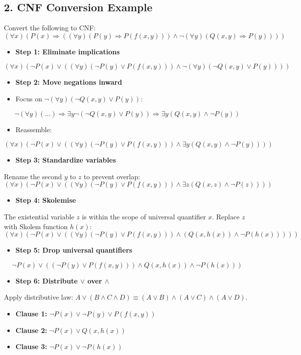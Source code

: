 \subsection{2. CNF Conversion Example}
Convert the following to CNF:
\[ (\forall x)(P(x) \Rightarrow ((\forall y)(P(y) \Rightarrow P(f(x, y))) \land \neg (\forall y)(Q(x, y) \Rightarrow P(y)))) \]

\begin{itemize}
  \item   \textbf{Step 1: Eliminate implications}
\end{itemize}
    \[ (\forall x)(\neg P(x) \lor ((\forall y)(\neg P(y) \lor P(f(x, y))) \land \neg (\forall y)(\neg Q(x, y) \lor P(y)))) \]
\begin{itemize}
  \item   \textbf{Step 2: Move negations inward}
  \item   Focus on $\neg (\forall y)(\neg Q(x, y) \lor P(y))$:
\end{itemize}
        \[ \neg (\forall y)(\dots) \Longrightarrow \exists y \neg(\neg Q(x, y) \lor P(y)) \Longrightarrow \exists y (Q(x, y) \land \neg P(y)) \]
\begin{itemize}
  \item   Reassemble:
\end{itemize}
        \[ (\forall x)(\neg P(x) \lor ((\forall y)(\neg P(y) \lor P(f(x, y))) \land \exists y (Q(x, y) \land \neg P(y)))) \]
\begin{itemize}
  \item   \textbf{Step 3: Standardize variables}
\end{itemize}
    Rename the second $y$ to $z$ to prevent overlap:
    \[ (\forall x)(\neg P(x) \lor ((\forall y)(\neg P(y) \lor P(f(x, y))) \land \exists z (Q(x, z) \land \neg P(z)))) \]
\begin{itemize}
  \item   \textbf{Step 4: Skolemise}
\end{itemize}
    The existential variable $z$ is within the scope of universal quantifier $x$. Replace $z$ with Skolem function $h(x)$:
    \[ (\forall x)(\neg P(x) \lor ((\forall y)(\neg P(y) \lor P(f(x, y))) \land (Q(x, h(x)) \land \neg P(h(x))))) \]
\begin{itemize}
  \item   \textbf{Step 5: Drop universal quantifiers}
\end{itemize}
    \[ \neg P(x) \lor ((\neg P(y) \lor P(f(x, y))) \land Q(x, h(x)) \land \neg P(h(x))) \]
\begin{itemize}
  \item   \textbf{Step 6: Distribute $\lor$ over $\land$}
\end{itemize}
    Apply distributive law: $A \lor (B \land C \land D) \equiv (A \lor B) \land (A \lor C) \land (A \lor D)$.
\begin{itemize}
  \item   \textbf{Clause 1:} $\neg P(x) \lor \neg P(y) \lor P(f(x, y))$
  \item   \textbf{Clause 2:} $\neg P(x) \lor Q(x, h(x))$
  \item   \textbf{Clause 3:} $\neg P(x) \lor \neg P(h(x))$
\end{itemize}


